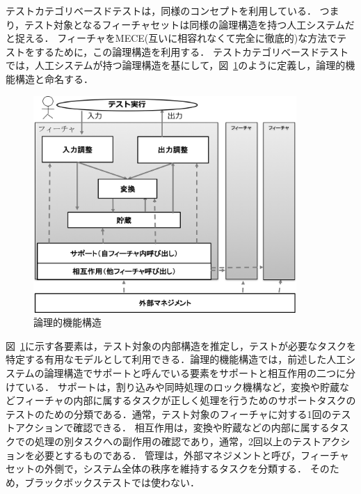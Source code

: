 テストカテゴリベースドテストは，同様のコンセプトを利用している．
つまり，テスト対象となるフィーチャセットは同様の論理構造を持つ人工システムだと捉える．
フィーチャをMECE(互いに相容れなくて完全に徹底的)\cite{ethan1999mckinsey}な方法でテストをするために，この論理構造を利用する．
テストカテゴリベースドテストでは，人工システムが持つ論理構造を基にして，図~\ref{fig:D-2-LSOF2}のように定義し，論理的機能構造と命名する．

\begin{figure}[htbp]
  \begin{center}
	\includegraphics[width=10cm]{./image/D-3-Fig3.png}
	\caption{論理的機能構造}
	\label{fig:D-2-LSOF2}
  \end{center}
\end{figure}

図~\ref{fig:D-2-LSOF2}に示す各要素は，テスト対象の内部構造を推定し，テストが必要なタスクを特定する有用なモデルとして利用できる．論理的機能構造では，前述した人工システムの論理構造でサポートと呼んでいる要素をサポートと相互作用の二つに分けている．
サポートは，割り込みや同時処理のロック機構など，変換や貯蔵などフィーチャの内部に属するタスクが正しく処理を行うためのサポートタスクのテストのための分類である．通常，テスト対象のフィーチャに対する1回のテストアクションで確認できる．
相互作用は，変換や貯蔵などの内部に属するタスクでの処理の別タスクへの副作用の確認であり，通常，2回以上のテストアクションを必要とするものである．
管理は，外部マネジメントと呼び，フィーチャセットの外側で，システム全体の秩序を維持するタスクを分類する．
そのため，ブラックボックステストでは使わない．

